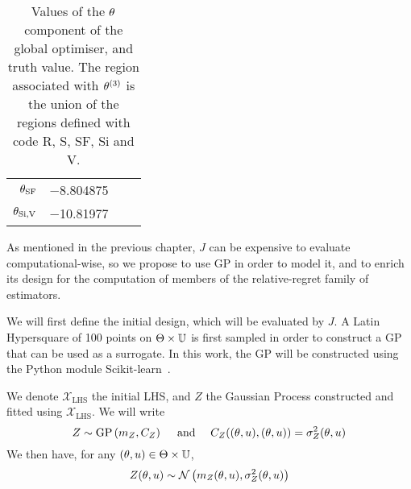 \documentclass[../../Main_ManuscritThese.tex]{subfiles}
\begin{document}
\begin{table}[!h]
\begin{tabular}{rrrr}
    $\theta_{\mathrm{SF}}$   & \num[round-mode=places,round-precision=4]{-8.804875}                                                                                                                                                                                                                                        &                          &                                                                         \\
    $\theta_{\mathrm{Si,V}}$ & \num[round-mode=places,round-precision=4]{-10.81977}                                                                                                                                                                                                                                        &                          &                                                                         \\ \bottomrule
  \end{tabular}
  \caption[Values of the $\kk$ component of the global optimiser, and
  truth value]{\label{tab:ktruthkopt} Values of the $\kk$ component of
    the global optimiser, and truth value. The region associated with
    $\theta^{(3)}$ is the union of the regions defined with code R, S,
    SF, Si and V.}
\end{table}


As mentioned in the previous chapter, $J$ can be expensive to evaluate
computational-wise, so we propose to use GP in order to model it, and
to enrich its design for the computation of members of the
relative-regret family of estimators.

We will first define the initial design, which will be evaluated by
$J$. A Latin Hypersquare of \num{100} points on
$\Theta \times \mathbb{U}$ is first sampled in order to construct a GP
that can be used as a surrogate.  In this work, the GP will be
constructed using the Python module
Scikit-learn~\citep{pedregosa_scikit-learn_2011}.

We denote $\mathcal{X}_{\mathrm{LHS}}$ the initial LHS, and $Z$ the
Gaussian Process constructed and fitted using
$\mathcal{X}_{\mathrm{LHS}}$.  We will write
\begin{equation}
  Z \sim \operatorname{\mathrm{GP}}\left(m_Z, C_Z\right) \quad\text{ and } \quad C_Z((\theta, u),(\theta, u)) = \sigma^2_Z(\theta, u)
\end{equation}
We then have, for any $(\theta, u) \in \Theta\times\mathbb{U}$,
\begin{equation}
  Z(\theta, u) \sim \mathcal{N}\left(m_Z(\theta, u), \sigma^2_Z(\theta, u)\right)
\end{equation}
\end{document}
